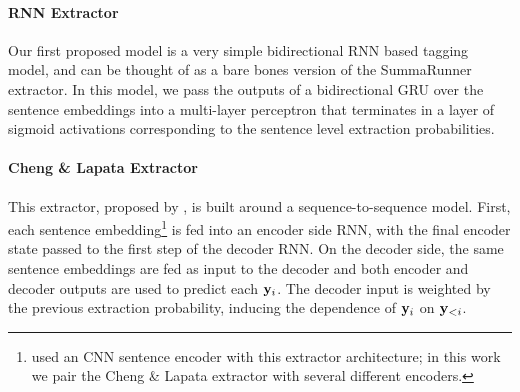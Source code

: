 \paragraph{RNN Extractor \citep{kedzie2018deep}}
    Our first proposed model is a very simple bidirectional
RNN based tagging model, and can be thought of as a 
bare bones version of the SummaRunner
extractor. In this model, we pass the outputs of a bidirectional GRU over the 
sentence embeddings into a multi-layer perceptron that terminates in a layer 
of
sigmoid activations corresponding to the sentence level extraction probabilities.




\paragraph{Cheng \& Lapata Extractor} 
 This extractor, proposed by 
\citet{cheng2016neural}, %
is built around a sequence-to-sequence model.
First, each sentence embedding\footnote{\citet{cheng2016neural} used an CNN sentence encoder with 
this extractor architecture; in this work we pair the Cheng \& Lapata extractor
with several different encoders.} is
fed into an encoder side RNN, with the final encoder state passed to the
first step of the decoder RNN. On the decoder side, the same sentence 
embeddings are fed as input to the decoder and both encoder and decoder 
outputs are used to predict each $\mathbf{y}_i$. The decoder input is weighted by the previous 
extraction
probability, inducing the dependence of $\mathbf{y}_i$ on $\mathbf{y}_{<i}$.




